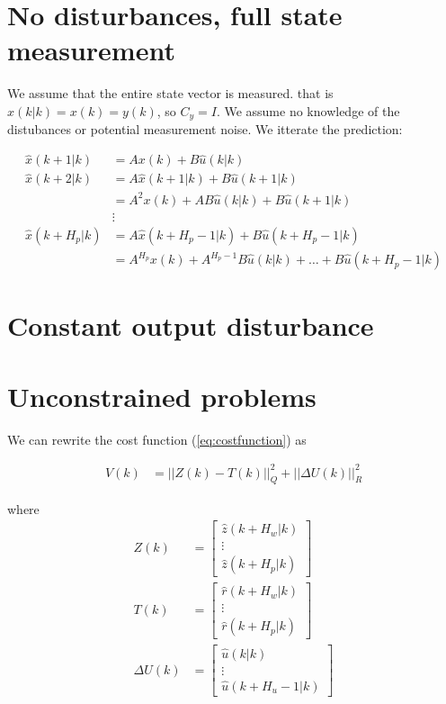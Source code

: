 \documentclass[a4paper]{article}
\begin{document}
\section{No disturbances, full state measurement}
We assume that the entire state vector is measured. that is $ \hat{x}(k|k) = x(k) = y(k) $, so $ C_y = I $. We assume no knowledge of the distubances or potential measurement noise. We itterate the prediction:

\begin{align}
\hat{x}(k+1|k) &= A x(k) + B \hat{u}(k|k) \\
\hat{x}(k+2|k) &= A \hat{x}(k+1|k) + B \hat{u}(k+1|k) \\
&= A^{2} x(k) + A B \hat{u}(k|k) + B \hat{u}(k+1|k) \\
&\vdots\\
\hat{x}(k+H_p|k) &= A \hat{x}(k+ H_p - 1|k) + B \hat{u}(k+H_p - 1|k) \\
				 &= A^{H_p} x(k) + A^{H_p -1} B \hat{u}(k|k) + \ldots + B \hat{u}(k+H_p - 1|k)
\end{align}


\section{Constant output disturbance}


\section{Unconstrained problems}
We can rewrite the cost function (\ref{eq:costfunction}) as 

\begin{align}
	V(k) &= ||Z(k) - T(k)||_{Q}^{2} + || \Delta U(k) ||_{R}^{2}  
\end{align}

where 
\begin{align}
Z(k) &= \begin{bmatrix}
\hat{z}(k+ H_w|k) \\
\vdots \\
\hat{z}(k+ H_p|k) 
\end{bmatrix} \\
T(k) &= \begin{bmatrix}
\hat{r}(k+ H_w|k) \\
\vdots \\
\hat{r}(k+ H_p|k) 
\end{bmatrix}  \\
\Delta U(k) &= \begin{bmatrix}
\hat{u}(k|k) \\
\vdots \\
\hat{u}(k+ H_u - 1|k) 
\end{bmatrix}  
\end{align}
\end{document}

